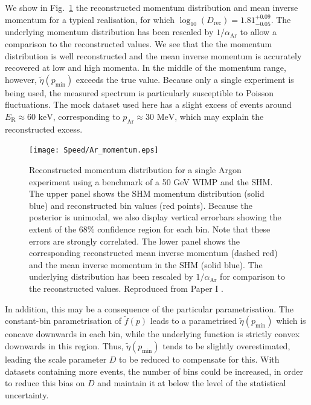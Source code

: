 We show in Fig.\ \ref{fig:Speed:Ar_Momentum} the reconstructed momentum distribution and mean inverse momentum for a typical realisation, for which $\log_{10}(D_\textrm{rec}) = 1.81_{-0.05}^{+0.09}$. The underlying momentum distribution has been rescaled by \(1/\alpha_\textrm{Ar}\) to allow a comparison to the reconstructed values. We see that the the momentum distribution is well reconstructed and the mean inverse momentum is accurately recovered at low and high momenta. In the middle of the momentum range, however, \(\tilde{\eta}(p_\textrm{min})\) exceeds the true value. Because only a single experiment is being used, the measured spectrum is particularly susceptible to Poisson fluctuations. The mock dataset used here has a slight excess of events around \(E_\textrm{R} \approx 60 \textrm{ keV}\), corresponding to \(p_\textrm{Ar} \approx 30 \textrm{ MeV}\), which may explain the reconstructed excess.

 \begin{figure}[t]
\centering
\texttt{[image: Speed/Ar\_momentum.eps]}
\caption[Reconstructed momentum distribution for a single Argon experiment using a benchmark of a 50 GeV WIMP and the SHM]{Reconstructed momentum distribution for a single Argon experiment using a benchmark of a 50 GeV WIMP and the SHM.  The upper panel shows the SHM momentum distribution (solid blue) and reconstructed bin values (red points). Because the posterior is unimodal, we also display vertical errorbars showing the extent of the 68\% confidence region for each bin. Note that these errors are strongly correlated. The lower panel shows the corresponding reconstructed mean inverse momentum (dashed red) and the mean inverse momentum in the SHM (solid blue). The underlying distribution has been rescaled by \(1/\alpha_{\textrm{Ar}}\) for comparison to the reconstructed values. Reproduced from Paper I \cite{Kavanagh:2012}.}
  \label{fig:Speed:Ar_Momentum}
\end{figure}


In addition, this may be a consequence of the particular parametrisation. The constant-bin parametrisation of \(\tilde{f}(p)\) leads to a parametrised \(\tilde{\eta}(p_\textrm{min})\) which is concave downwards in each bin, while the underlying function is strictly convex downwards in this region. Thus, \(\tilde{\eta}(p_\textrm{min})\) tends to be slightly overestimated, leading the scale parameter \(D\) to be reduced to compensate for this. With datasets containing more events, the number of bins could be increased, in order to reduce this bias on \(D\) and maintain it at below the level of the statistical uncertainty.


